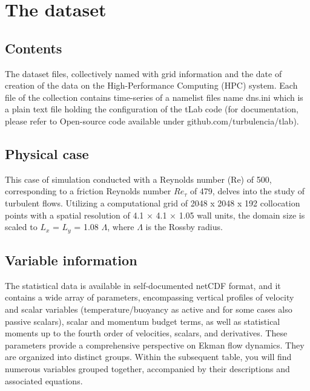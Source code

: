 \documentclass[11pt]{article}
\begin{document}
\section{The dataset}

\subsection{Contents}

The dataset files, collectively named with grid information and the date of creation of the data on the High-Performance Computing (HPC) system. Each file of the collection contains time-series of a namelist files name dns.ini which is a plain text file holding the configuration of the tLab code (for documentation, please refer to Open-source code available under github.com/turbulencia/tlab). \\

\subsection{Physical case}

This case of simulation conducted with a Reynolds number (Re) of 500, corresponding to a friction Reynolds number \(Re_{\tau}\) of 479, delves into the study of turbulent flows. Utilizing a computational grid of 2048 x 2048 x 192 collocation points with a spatial resolution of 4.1 × 4.1 × 1.05 wall units, the domain size is scaled to \(L_x\) = \(L_y\) = 1.08 \(\Lambda\), where \(\Lambda\) is the Rossby radius. \\

\subsection{Variable information}

The statistical data is available in self-documented netCDF format, and it contains a wide array of parameters, encompassing vertical profiles of velocity and scalar variables (temperature/buoyancy as active and for some cases also passive scalars), scalar and momentum budget terms, as well as statistical moments up to the fourth order of velocities, scalars, and derivatives. These parameters provide a comprehensive perspective on Ekman flow dynamics. They are organized into distinct groups. Within the subsequent table, you will find numerous variables grouped together, accompanied by their descriptions and associated equations.
\end{document}

